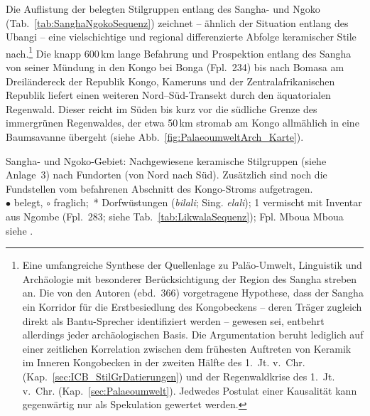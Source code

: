 Die Auflistung der belegten Stilgruppen entlang des \mbox{Sangha}- und \mbox{Ngoko} (Tab.~\ref{tab:SanghaNgokoSequenz}) zeichnet -- ähnlich der Situation entlang des \mbox{Ubangi} -- eine vielschichtige und regional differenzierte Abfolge keramischer Stile nach.\footnote{Eine umfangreiche Synthese der Quellenlage zu Paläo-Umwelt, Linguistik und Archäologie mit besonderer Berücksichtigung der Region des \mbox{Sangha} streben \textcite{Bostoen.2015} an. Die von den Autoren (ebd.~366) vorgetragene Hypothese, dass der \mbox{Sangha} ein Korridor für die Erstbesiedlung des Kongobeckens -- deren Träger zugleich direkt als Bantu-Sprecher identifiziert werden -- gewesen sei, entbehrt allerdings jeder archäologischen Basis. Die Argumentation beruht lediglich auf einer zeitlichen Korrelation zwischen dem frühesten Auftreten von Keramik im Inneren Kongobecken in der zweiten Hälfte des 1.~Jt. v.~Chr. (Kap.~\ref{sec:ICB_StilGrDatierungen}) und der Regenwaldkrise des 1.~Jt. v.~Chr. (Kap.~\ref{sec:Palaeoumwelt}). Jedwedes Postulat einer Kausalität kann gegenwärtig nur als Spekulation gewertet werden.} Die knapp 600\,km lange Befahrung und Prospektion entlang des \mbox{Sangha} von seiner Mündung in den Kongo bei Bonga (Fpl.~234) bis nach Bomasa am Dreiländereck der Republik Kongo, Kameruns und der Zentralafrikanischen Republik liefert einen weiteren Nord--Süd-Transekt durch den äquatorialen Regenwald. Dieser reicht im Süden bis kurz vor die südliche Grenze des immergrünen Regenwaldes, der etwa 50\,km stromab am Kongo allmählich in eine Baumsavanne übergeht (siehe Abb.~\ref{fig:PalaeoumweltArch_Karte}). 

\begin{table*}[!tb]
	\centering
	\resizebox{1.02\textwidth}{!}{%
		{\footnotesize 
			
		}
	}
	\caption{\mbox{Sangha}- und \mbox{Ngoko}-Gebiet: Nachgewiesene keramische Stilgruppen (siehe Anlage~3) nach Fundorten (von Nord nach Süd). Zusätzlich sind noch die Fundstellen vom befahrenen Abschnitt des Kongo-Stroms aufgetragen.\\$\bullet$ belegt, $\circ$ fraglich;~* Dorfwüstungen (\textit{bilali}; Sing. \textit{elali}); 1 vermischt mit Inventar aus Ngombe (Fpl.~283; siehe Tab.~\ref{tab:LikwalaSequenz}); Fpl. Mboua Mboua siehe \textcite[114 Abb.~42]{Gillet.2013}.}
	\label{tab:SanghaNgokoSequenz}
\end{table*}

